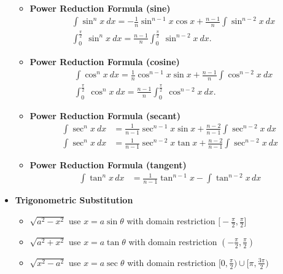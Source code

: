 \documentclass{report}
\begin{document}
\begin{itemize}
\begin{itemize}
                \item \textbf{Power Reduction Formula (sine)}
                    \begin{align*}
                        &\int \sin^{n}{x}\ dx = -\frac{1}{n}\sin^{n-1}{x}\cos{x} + \frac{n-1}{n}\int \sin^{n-2}{x}\ dx \\
                        &\int_{0}^{\frac{\pi}{2}}\ \sin^{n}{x}\ dx = \frac{n-1}{n}\int_{0}^{\frac{\pi}{2}}\ \sin^{n-2}{x}\ dx
                    .\end{align*}
                \item \textbf{Power Reduction Formula (cosine)}
                    \begin{align*}
                        &\int \cos^{n}{x}\ dx = \frac{1}{n}\cos^{n-1}{x}\sin{x} + \frac{n-1}{n}\int \cos^{n-2}{x}\ dx \\
                        &\int_{0}^{\frac{\pi}{2}}\ \cos^{n}{x}\ dx = \frac{n-1}{n}\int_{0}^{\frac{\pi}{2}}\ \cos^{n-2}{x}\ dx
                    .\end{align*}
                \item \textbf{Power Reduction Formula (secant)}
                \begin{align*}
                    \int \sec^{n}{x}\ dx &= \frac{1}{n-1}\sec^{n-1}{x}\sin{x}+\frac{n-2}{n-1}\int \sec^{n-2}{x}\ dx \\
                    \int \sec^{n}{x}\ dx &= \frac{1}{n-1}\sec^{n-2}{x}\tan{x}+\frac{n-2}{n-1}\int \sec^{n-2}{x}\ dx
                \end{align*}

                \item \textbf{Power Reduction Formula (tangent)}
                \begin{align*}
                    \int \tan^n x \, dx &= \frac{1}{n-1} \tan^{n-1}x - \int \tan^{n-2}x \, dx
                \end{align*}
            \end{itemize}
            \item \textbf{Trigonometric Substitution}
            \begin{itemize}
                \item $\sqrt{a^{2} - x^{2}}$ use $x =a\sin{\theta }$ with domain restriction $\bigg[-\frac{\pi}{2},\frac{\pi}{2}\bigg] $
                \item $\sqrt{a^{2} + x^{2}}$ use $x=a\tan{\theta}$ with domain restriction $\left(-\frac{\pi}{2}, \frac{\pi}{2}\right)$
                \item $\sqrt{x^{2} - a^{2}}$ use $x =a\sec{\theta}$ with domain restriction $\bigg[0,\frac{\pi}{2}\bigg) \cup \bigg[\pi,\frac{3\pi}{2}\bigg)$ 
            \end{itemize}


\end{itemize}
\end{document}
